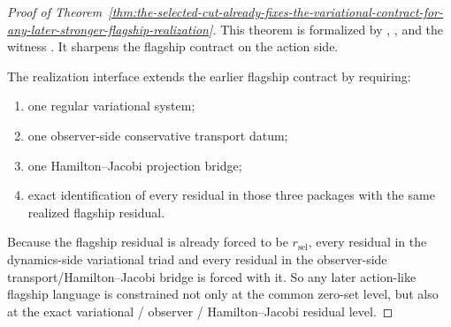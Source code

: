\begin{proof}[Proof of Theorem~\ref{thm:the-selected-cut-already-fixes-the-variational-contract-for-any-later-stronger-flagship-realization}]
\label{proof:thm:the-selected-cut-already-fixes-the-variational-contract-for-any-later-stronger-flagship-realization}
This theorem is formalized by
,
, and the
witness
.
It sharpens the flagship contract on the action side.

The realization interface extends the earlier flagship contract by requiring:
\begin{enumerate}
\item one regular variational system;
\item one observer-side conservative transport datum;
\item one Hamilton--Jacobi projection bridge;
\item exact identification of every residual in those three packages with the
      same realized flagship residual.
\end{enumerate}
Because the flagship residual is already forced to be \(r_{\mathrm{sel}}\),
every residual in the dynamics-side variational triad and every residual in
the observer-side transport/Hamilton--Jacobi bridge is forced with it. So any
later action-like flagship language is constrained not only at the common
zero-set level, but also at the exact variational / observer /
Hamilton--Jacobi residual level.
\end{proof}

